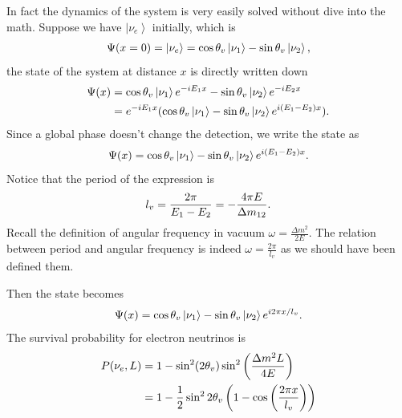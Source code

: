 \documentclass[letterpaper,12pt,english]{sphinxmanual}
\newcommand{\ket}[1]{\left| #1\right\rangle}
\begin{document}
In fact the dynamics of the system is very easily solved without dive into the math. Suppose we have \(\ket{\nu_e}\) initially, which is
\begin{gather}
\begin{split}\Psi(x=0)=\ket{\nu_e} = \cos \theta_v \ket{\nu_1} - \sin \theta_v \ket{\nu_2},\end{split}\notag
\end{gather}
the state of the system at distance \(x\) is directly written down
\begin{gather}
\begin{split}\Psi(x) &=  \cos \theta_v \ket{\nu_1} e^{-i E_1 x} - \sin \theta_v \ket{\nu_2} e^{-i E_2 x} \\
&= e^{-i E_1 x}( \cos \theta_v \ket{\nu_1}  - \sin \theta_v \ket{\nu_2} e^{i(E_1 - E_2) x}).\end{split}\notag
\end{gather}
Since a global phase doesn't change the detection, we write the state as
\begin{gather}
\begin{split}\Psi(x) =  \cos \theta_v \ket{\nu_1}  - \sin \theta_v \ket{\nu_2} e^{i(E_1 - E_2) x} .\end{split}\notag
\end{gather}
Notice that the period of the expression is
\begin{gather}
\begin{split}l_v = \frac{2\pi}{E_1 - E_2} = - \frac{4\pi E}{\Delta m_{12}}.\end{split}\notag
\end{gather}
Recall the definition of angular frequency in vacuum \(\omega = \frac{\Delta m^2}{2E}\). The relation between period and angular frequency is indeed \(\omega = \frac{2\pi}{l_v}\) as we should have been defined them.

Then the state becomes
\begin{gather}
\begin{split}\Psi(x) =  \cos \theta_v \ket{\nu_1}  - \sin \theta_v \ket{\nu_2} e^{i2\pi x/l_v} .\end{split}\notag
\end{gather}
The survival probability for electron neutrinos is
\begin{gather}
\begin{split}P(\nu_e,L) &= 1-\sin^2(2\theta_v)\sin^2\left( \frac{\Delta m^2 L}{4E} \right) \\
&= 1- \frac{1}{2}\sin^2 2\theta_v \left(1- \cos\left( \frac{2\pi x}{l_v} \right) \right)\end{split}\notag
\end{gather}
\end{document}
